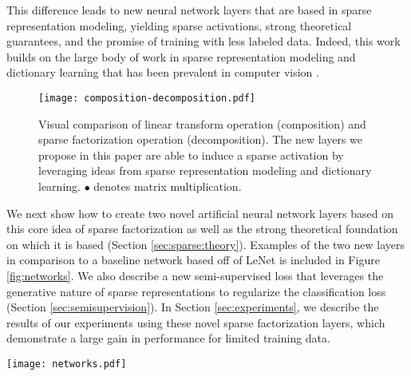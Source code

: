 \documentclass[10pt,twocolumn,letterpaper]{article}
\DeclareRobustCommand{\jason}[1]{{\hl{\;$^{\text{jason}}$ #1}}}
\begin{document}
This difference leads to new neural network layers that are based in sparse representation modeling, yielding sparse activations, strong theoretical guarantees, and the promise of training with less labeled data. 
%
Indeed, this work builds on the large body of work in sparse representation modeling and dictionary learning that has been prevalent in computer vision 
 \cite{YuLiLaCVPR2011,zhang2010discriminative,mairal2008sparse,luo2013group}.


\begin{figure}[t]
    \centering
    \texttt{[image: composition-decomposition.pdf]}
    \caption{Visual comparison of linear transform operation (composition) and sparse factorization operation (decomposition).  The new layers we propose in this paper are able to induce a sparse activation by leveraging ideas from sparse representation modeling and dictionary learning. $\bullet$ denotes matrix multiplication.}
\label{fig:visual_ltvsf}
\end{figure}

We next show how to create two novel artificial neural network layers based on this core idea of sparse factorization as well as the strong theoretical foundation on which it is based (Section \ref{sec:sparse:theory}).  Examples of the two new layers in comparison to a baseline network based off of LeNet \cite{LeBoBeIEEE1998} is included in Figure \ref{fig:networks}.  We also describe a new semi-supervised loss that leverages the generative nature of sparse representations to regularize the classification loss (Section \ref{sec:semisupervision}). 
%
In Section \ref{sec:experiments}, we describe the results of our experiments using these novel sparse factorization layers, which demonstrate a large gain in performance for limited training data.


\begin{figure*}
    \centering
    \texttt{[image: networks.pdf]}
    \caption{Illustrative comparison of the role our two new sparse factorization layers can provide in a classical network architecture (left) suitable for a digit classification problem like MNIST.  The three networks show the data layer at the bottom and the final activation at the top; computations are drawn in black and activation tensors are drawn in blue. The sparse factorization layer replaces both the fully connected layer and the subsequent rectified linear unit layer (since this would conflict with the possible negative weights of the sparse activation), which is why the SF network has only 6 layers.  The convolutional sparse factorization network replaces the first convolution layer with the CSF layer.  All other things are equal and comparable.   }
    \label{fig:networks}
\end{figure*}
\end{document}
